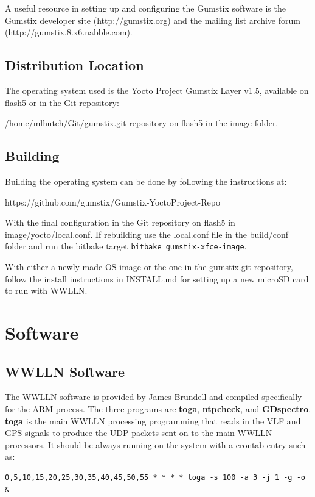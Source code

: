 \documentclass[12pt, letterpaper, onecolumn, oneside]{article}
\begin{document}
A useful resource in setting up and configuring the Gumstix software is the Gumstix developer site (http://gumstix.org) and the mailing list archive forum (http://gumstix.8.x6.nabble.com).

\subsection{Distribution Location}
\label{app:gum:distribution}
The operating system used is the Yocto Project Gumstix Layer v1.5, available on flash5 or in the Git repository:

/home/mlhutch/Git/gumstix.git repository on flash5 in the image folder.

\subsection{Building}

Building the operating system can be done by following the instructions at:

https://github.com/gumstix/Gumstix-YoctoProject-Repo

With the final configuration in the Git repository on flash5 in image/yocto/local.conf.
If rebuilding use the local.conf file in the build/conf folder and run the bitbake target \texttt{bitbake gumstix-xfce-image}.

With either a newly made OS image or the one in the gumstix.git repository, follow the install instructions in INSTALL.md for setting up a new microSD card to run with WWLLN.

\section{Software}

\subsection{WWLLN Software}

The WWLLN software is provided by James Brundell and compiled specifically for the ARM process.
The three programs are {\bf toga}, {\bf ntpcheck}, and {\bf GDspectro}.
{\bf toga} is the main WWLLN processing programming that reads in the VLF and GPS signals to produce the UDP packets sent on to the main WWLLN processors.
It should be always running on the system with a crontab entry such as:

\begin{verbatim}
0,5,10,15,20,25,30,35,40,45,50,55 * * * * toga -s 100 -a 3 -j 1 -g -o &
\end{verbatim}
\end{document}
